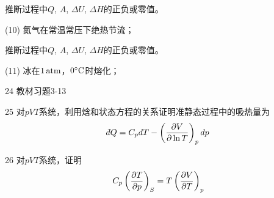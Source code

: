 \documentclass[CJK]{beamer}
\begin{document}
\begin{frame}
\bch


推断过程中$Q$, $A$, $\Delta U$, $\Delta H$的正负或零值。

\bitem
\item[(10)]{氮气在常温常压下绝热节流；}
\eitem

\ech
\end{frame}


\begin{frame}
\bch


推断过程中$Q$, $A$, $\Delta U$, $\Delta H$的正负或零值。

\bitem
\item[(11)]{冰在$1\,\mathrm{atm}$，$0^\circ \mathrm{C}$时熔化；}
\eitem

\ech
\end{frame}


\begin{frame}
\bch
\bitem
\item[24]{ 教材习题3-13}
\item[25]{ 对$pVT$系统，利用焓和状态方程的关系证明准静态过程中的吸热量为
$$ \dbar Q = C_p dT - \pfrac V{\ln T}p dp$$}
\item[26]{ 对$pVT$系统，证明
$$C_p \left(\frac{\partial T}{\partial p}\right)_{S} = T \left(\frac{\partial V}{\partial T}\right)_{p} $$ }
\eitem
\ech
\end{frame}
\end{document}
